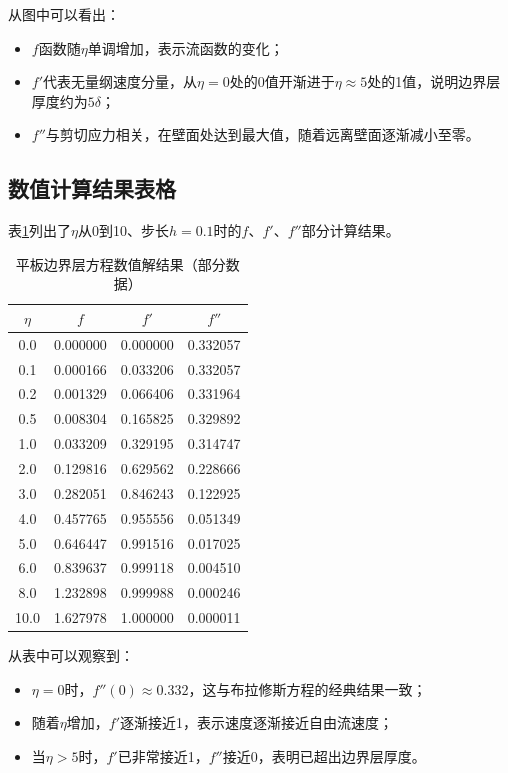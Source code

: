 \documentclass[12pt,a4paper]{article}
\begin{document}
从图中可以看出：
\begin{itemize}
    \item $f$函数随$\eta$单调增加，表示流函数的变化；
    \item $f'$代表无量纲速度分量，从$\eta=0$处的0值开渐进于$\eta\approx5$处的1值，说明边界层厚度约为$5\delta$；
    \item $f''$与剪切应力相关，在壁面处达到最大值，随着远离壁面逐渐减小至零。
\end{itemize}

\subsection{数值计算结果表格}
表\ref{tab:results}列出了$\eta$从0到10、步长$h=0.1$时的$f$、$f'$、$f''$部分计算结果。

\begin{table}[htbp]
\centering
\caption{平板边界层方程数值解结果（部分数据）}
\label{tab:results}
\begin{tabular}{cccc}
\toprule
$\eta$ & $f$ & $f'$ & $f''$ \\
\midrule
0.0 & 0.000000 & 0.000000 & 0.332057 \\
0.1 & 0.000166 & 0.033206 & 0.332057 \\
0.2 & 0.001329 & 0.066406 & 0.331964 \\
0.5 & 0.008304 & 0.165825 & 0.329892 \\
1.0 & 0.033209 & 0.329195 & 0.314747 \\
2.0 & 0.129816 & 0.629562 & 0.228666 \\
3.0 & 0.282051 & 0.846243 & 0.122925 \\
4.0 & 0.457765 & 0.955556 & 0.051349 \\
5.0 & 0.646447 & 0.991516 & 0.017025 \\
6.0 & 0.839637 & 0.999118 & 0.004510 \\
8.0 & 1.232898 & 0.999988 & 0.000246 \\
10.0 & 1.627978 & 1.000000 & 0.000011 \\
\bottomrule
\end{tabular}
\end{table}

从表中可以观察到：
\begin{itemize}
    \item $\eta=0$时，$f''(0) \approx 0.332$，这与布拉修斯方程的经典结果一致；
    \item 随着$\eta$增加，$f'$逐渐接近1，表示速度逐渐接近自由流速度；
    \item 当$\eta > 5$时，$f'$已非常接近1，$f''$接近0，表明已超出边界层厚度。
\end{itemize}
\end{document}
